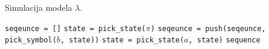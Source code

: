 \begin{algorithm}
\captionsetup{singlelinecheck=off}
\caption[Simulacija modela]{Simulacija modela $\lambda$.}
\label{koda:simulate_hmm}
\begin{algorithmic}
\State \texttt{seqeunce = []}
\State \texttt{state = pick\_state($\pi$)}
  \State \texttt{seqeunce = push(seqeunce, pick\_symbol($b$, state))}
  \State \texttt{state = pick\_state($a$, state)}
\EndWhile
\State
\Return \texttt{sequence}
\end{algorithmic}
\end{algorithm}
